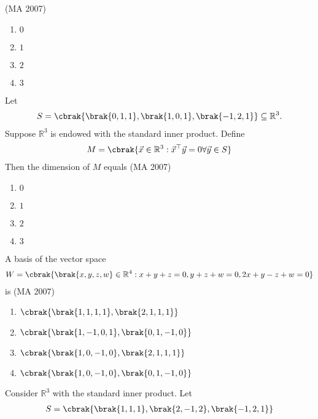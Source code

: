         \hfill{(MA 2007)}
\begin{multicols}{4}
\begin{enumerate}    
    \item $0$
    \item $1$
    \item $2$
    \item $3$
\end{enumerate}
\end{multicols}
\item Let
\begin{align*}
S = \cbrak{\brak{0,1,1}, \brak{1,0,1}, \brak{-1,2,1}} \subseteq \mathbb{R}^3.
\end{align*}
Suppose $\mathbb{R}^3$ is endowed with the standard inner product. Define 
\begin{align*}
M = \cbrak{\vec{x} \in \mathbb{R}^3 :  \vec{x}^\top \vec{y}  = 0 \forall  \vec{y} \in S}
\end{align*}
Then the dimension of $M$ equals \hfill{(MA 2007)}
\begin{multicols}{4}
\begin{enumerate}    
    \item $0$
    \item $1$
    \item $2$
    \item $3$ 
\end{enumerate}
\end{multicols}
%
\item A basis of the vector space 
\begin{align*}
W = \cbrak{\brak{x,y,z,w} \in \mathbb{R}^4 : x + y + z = 0, y + z + w = 0, 2x + y - z + w = 0}
\end{align*}
is  \hfill{(MA 2007)}
\begin{multicols}{2}
\begin{enumerate}    
    \item $\cbrak{\brak{1,1,1,1}, \brak{2,1,1,1}}$
    \item $\cbrak{\brak{1,-1,0,1}, \brak{0,1,-1,0}}$
    \item $\cbrak{\brak{1,0,-1,0}, \brak{2,1,1,1}}$
    \item $\cbrak{\brak{1,0,-1,0}, \brak{0,1,-1,0}}$
\end{enumerate}
\end{multicols}
\item Consider $\mathbb{R}^3$ with the standard inner product. Let
\begin{align*}
 S = \cbrak{\brak{1,1,1}, \brak{2,-1,2}, \brak{-1,2,1}}   
\end{align*}
